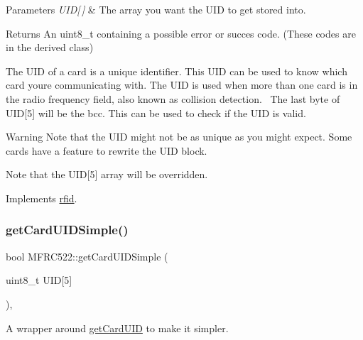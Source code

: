 \begin{DoxyParams}{Parameters}
{\em U\+I\+D\mbox{[}$\,$\mbox{]}} & The array you want the U\+ID to get stored into. \\
\hline
\end{DoxyParams}
\begin{DoxyReturn}{Returns}
An uint8\+\_\+t containing a possible error or succes code. (These codes are in the derived class)
\end{DoxyReturn}
The U\+ID of a card is a unique identifier. This U\+ID can be used to know which card you\textquotesingle{}re communicating with. The U\+ID is used when more than one card is in the radio frequency field, also known as collision detection.~\newline
 The last byte of U\+ID\mbox{[}5\mbox{]} will be the bcc. This can be used to check if the U\+ID is valid. \begin{DoxyWarning}{Warning}
Note that the U\+ID might not be as unique as you might expect. Some cards have a feature to rewrite the U\+ID block. 

Note that the U\+ID\mbox{[}5\mbox{]} array will be overridden. 
\end{DoxyWarning}


Implements \mbox{\hyperlink{classrfid_afeb2a321694ceaf84db793f5efb3a750}{rfid}}.

\mbox{\label{class_m_f_r_c522_a33c20be6030f635d986984db4999a1eb}} 
\subsubsection{\texorpdfstring{get\+Card\+U\+I\+D\+Simple()}{getCardUIDSimple()}}
{\footnotesize\ttfamily bool M\+F\+R\+C522\+::get\+Card\+U\+I\+D\+Simple (\begin{DoxyParamCaption}\item[{uint8\+\_\+t}]{U\+ID\mbox{[}5\mbox{]} }\end{DoxyParamCaption})\hspace{0.3cm}{\ttfamily [override]}, {\ttfamily [virtual]}}



A wrapper around \mbox{\hyperlink{class_m_f_r_c522_ad3c7ab4c70988e80c400f36f724a12b7}{get\+Card\+U\+ID}} to make it simpler. 


